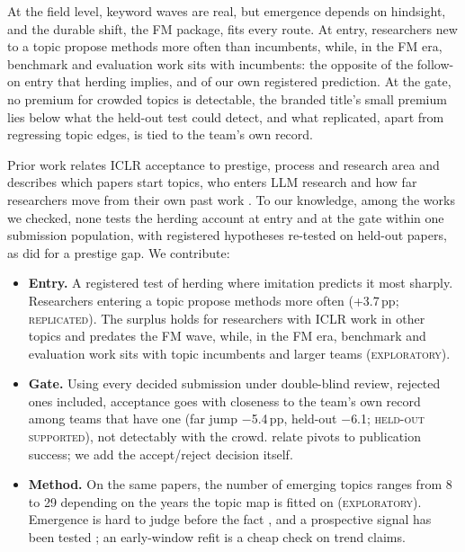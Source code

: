 \documentclass[11pt]{article}
\newcommand{\lab}[1]{\textsc{#1}}
\begin{document}
At the field level, keyword waves are real, but emergence depends on hindsight, and the durable shift, the FM
package, fits every route. At entry, researchers new to a topic propose methods more often than incumbents, while,
in the FM era, benchmark and evaluation work sits with incumbents: the opposite of the follow-on entry that herding
implies, and of our own registered prediction. At the gate, no premium for crowded topics is detectable, the branded
title's small premium lies below what the held-out test could detect, and what replicated, apart from regressing
topic edges, is tied to the team's own record.

Prior work relates ICLR acceptance to prestige, process and research area
\citep{tran2020open,ibrahim2026bias,jung2025what,wang2023what,xu2026reviewer} and describes which papers start
topics, who enters LLM research and how far researchers move from their own past work
\citep{huang2026catalyst,movva2024topics,bao2025persistence}. To our knowledge, among the works we checked, none
tests the herding account at entry and at the gate within one submission population, with registered hypotheses
re-tested on held-out papers, as \citet{ibrahim2026bias} did for a prestige gap. We contribute:
\begin{itemize}[leftmargin=*,itemsep=1pt,topsep=3pt,parsep=0pt]
\item \textbf{Entry.} A registered test of herding where imitation predicts it most sharply. Researchers entering a
topic propose methods more often (+3.7\,pp; \lab{replicated}). The surplus holds for researchers with ICLR work in
other topics and predates the FM wave, while, in the FM era, benchmark and evaluation work sits with topic
incumbents and larger teams (\lab{exploratory}).
\item \textbf{Gate.} Using every decided submission under double-blind review, rejected ones included, acceptance
goes with closeness to the team's own record among teams that have one (far jump $-$5.4\,pp, held-out $-$6.1;
\lab{held-out supported}), not detectably with the crowd.
\citet{hill2025pivot} relate pivots to publication success; we add the accept/reject decision itself.
\item \textbf{Method.} On the same papers, the number of emerging topics ranges from 8 to 29 depending on the
years the topic map is fitted on (\lab{exploratory}). Emergence is hard to judge before the fact
\citep{rotolo2015what,li2025evaluation}, and a prospective signal has been tested \citep{khanbayov2026topical};
an early-window refit is a cheap check on trend claims.
\end{itemize}
\end{document}
